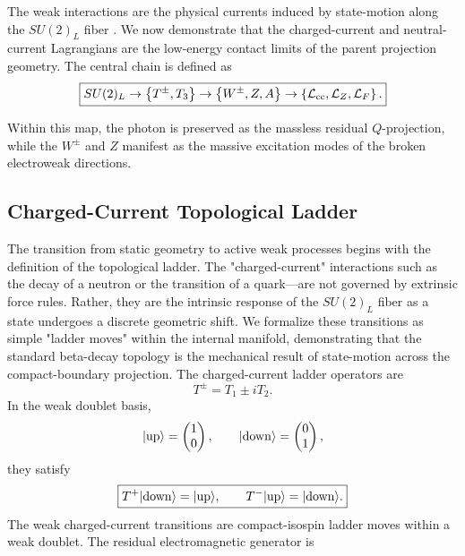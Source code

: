\documentclass[11pt]{article}
\begin{document}
 The weak interactions are the physical currents induced by state-motion along the $SU(2)_L$ fiber \cite{FeynmanGellMann1958}. We now demonstrate that the charged-current and neutral-current Lagrangians are the low-energy contact limits of the parent projection geometry. The central chain is defined as
\begin{equation}
\boxed{
SU(2)_L
\rightarrow
\left\{ T^\pm, T_3 \right\}
\rightarrow
\left\{ W^\pm, Z, A \right\}
\rightarrow
\left\{ \mathcal{L}_{\rm cc}, \mathcal{L}_Z, \mathcal{L}_F \right\}.
}
\end{equation}

Within this map, the photon is preserved as the massless residual $Q$-projection, while the $W^\pm$ and $Z$ manifest as the massive excitation modes of the broken electroweak directions.

\subsection{Charged-Current Topological Ladder}
\label{sec:pr2_charged_current_ladder}
The transition from static geometry to active weak processes begins with the definition of the topological ladder. The "charged-current" interactions such as the decay of a neutron or the transition of a quark—are not governed by extrinsic force rules. Rather, they are the intrinsic response of the $SU(2)_L$ fiber as a state undergoes a discrete geometric shift. We formalize these transitions as simple "ladder moves" within the internal manifold, demonstrating that the standard beta-decay topology is the mechanical result of state-motion across the compact-boundary projection. The charged-current ladder operators are
\begin{equation}
T^\pm
=
T_1\pm iT_2.
\end{equation}
In the weak doublet basis,
\begin{equation}
|{\rm up}\rangle
=
\begin{pmatrix}
1\\
0
\end{pmatrix},
\qquad
|{\rm down}\rangle
=
\begin{pmatrix}
0\\
1
\end{pmatrix},
\end{equation}
they satisfy
\begin{equation}
\boxed{
T^+|{\rm down}\rangle
=
|{\rm up}\rangle,
\qquad
T^-|{\rm up}\rangle
=
|{\rm down}\rangle.
}
\end{equation}
The weak charged-current transitions are compact-isospin ladder moves within a weak doublet. The residual electromagnetic generator is
\end{document}
